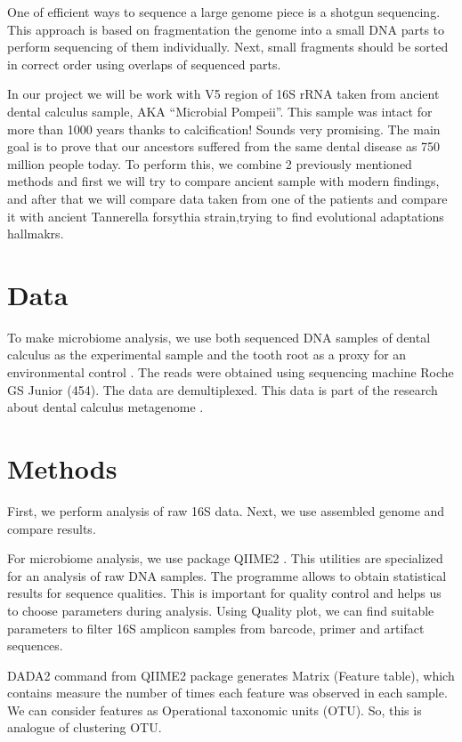 \documentclass{article}
\begin{document}
One of  efficient ways to sequence a large genome piece is a shotgun sequencing. This approach is based on fragmentation the genome into a    small DNA parts to perform sequencing  of them individually. Next, small  fragments  should be sorted in correct order using overlaps of  sequenced parts.

In our project we will be work with V5 region of 16S rRNA taken from ancient dental calculus sample, AKA “Microbial Pompeii”. This sample was intact for more than 1000 years thanks to calcification! Sounds very promising. The main goal is to prove that our ancestors suffered from the same dental disease as 750 million people today. To perform this, we combine 2 previously mentioned methods and first we will try to compare ancient sample with modern findings, and after that we will compare data taken from one of the patients and compare it with ancient Tannerella forsythia strain,trying to find evolutional adaptations hallmakrs.


 
 \section{Data}
To make microbiome analysis, we use both sequenced DNA   samples of dental calculus as the experimental sample and the tooth root as a proxy for an environmental control \cite{Data}. The reads were obtained using sequencing machine Roche GS Junior (454). The data are demultiplexed. This data is part  of the research about  dental calculus metagenome \cite{DataResearch}. 

 

\section{Methods}
First, we perform analysis of raw 16S data. Next, we use assembled genome and compare results. 


 For  microbiome analysis, we use package QIIME2 \cite{quime}. This utilities are specialized for an analysis of raw DNA samples. The programme allows to obtain statistical results for sequence qualities. This is important for quality control and helps us to choose parameters during analysis. Using Quality plot, we can find suitable parameters to filter 16S amplicon  samples from barcode, primer and artifact sequences. 
 
 DADA2 command from QIIME2 package generates Matrix (Feature table), which contains measure the number of times each feature was observed in each sample. We can consider  features as Operational taxonomic units (OTU). So, this is analogue of clustering OTU.
 
\end{document}

